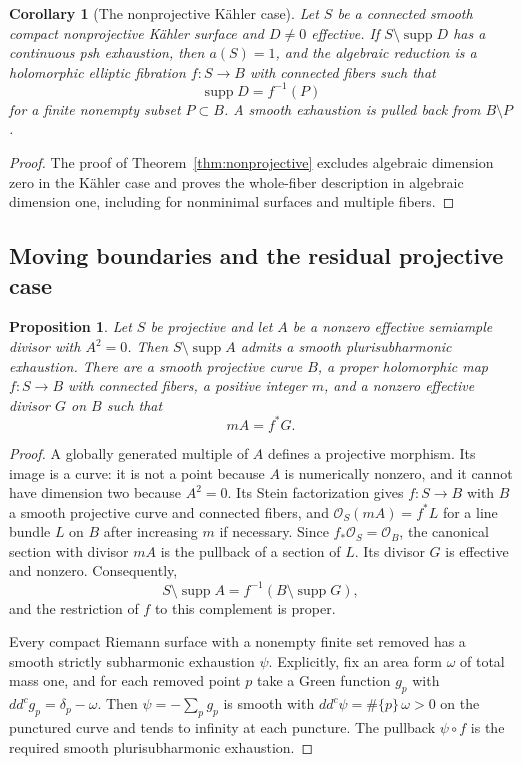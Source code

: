 \documentclass[11pt]{amsart}
\newtheorem{proposition}[theorem]{Proposition}
\newtheorem{corollary}[theorem]{Corollary}
\theoremstyle{definition}
\theoremstyle{remark}
\numberwithin{equation}{section}
\newcommand{\OO}{\mathcal O}
\newcommand{\ddc}{dd^c}
\newcommand{\supp}{\operatorname{supp}}
\begin{document}
\begin{corollary}[The nonprojective K\"ahler case]
\label{thm:surface-nonprojective-pair}
Let $S$ be a connected smooth compact nonprojective K\"ahler surface
and $D\ne0$ effective. If $S\setminus\supp D$ has a continuous psh
exhaustion, then $a(S)=1$, and the algebraic reduction is a holomorphic
elliptic fibration $f:S\to B$ with connected fibers such that
\[
 \supp D=f^{-1}(P)
\]
for a finite nonempty subset $P\subset B$. A smooth exhaustion is
pulled back from $B\setminus P$.
\end{corollary}
\begin{proof}
The proof of Theorem~\ref{thm:nonprojective} excludes algebraic
dimension zero in the K\"ahler case and proves the whole-fiber
description in algebraic dimension one, including for nonminimal
surfaces and multiple fibers.
\end{proof}

\subsection{Moving boundaries and the residual projective case}

\begin{proposition}\label{prop:surface-semiample-boundary}
Let $S$ be projective and let $A$ be a nonzero effective semiample
divisor with $A^2=0$.  Then $S\setminus\supp A$ admits a smooth
plurisubharmonic exhaustion.  There are a smooth projective curve $B$,
a proper holomorphic map $f:S\to B$ with connected fibers, a positive
integer $m$, and a nonzero effective divisor $G$ on $B$ such that
\[
 mA=f^*G.
\]
\end{proposition}
\begin{proof}
A globally generated multiple of $A$ defines a projective morphism.
Its image is a curve: it is not a point because $A$ is numerically
nonzero, and it cannot have dimension two because $A^2=0$.  Its Stein
factorization gives $f:S\to B$ with $B$ a smooth projective curve and
connected fibers, and $\OO_S(mA)=f^*L$ for a line bundle $L$ on $B$
after increasing $m$ if necessary.  Since $f_*\OO_S=\OO_B$, the
canonical section with divisor $mA$ is the pullback of a section of
$L$.  Its divisor $G$ is effective and nonzero.  Consequently,
\[
 S\setminus\supp A=f^{-1}(B\setminus\supp G),
\]
and the restriction of $f$ to this complement is proper.

Every compact Riemann surface with a nonempty finite set removed has
a smooth strictly subharmonic exhaustion $\psi$.  Explicitly, fix an
area form $\omega$ of total mass one, and for each removed point $p$
take a Green function $g_p$ with $\ddc g_p=\delta_p-\omega$.  Then
$\psi=-\sum_p g_p$ is smooth with $\ddc\psi=\#\{p\}\,\omega>0$ on
the punctured curve and tends to infinity at each puncture.  The
pullback $\psi\circ f$ is the required smooth plurisubharmonic
exhaustion.
\end{proof}
\end{document}
